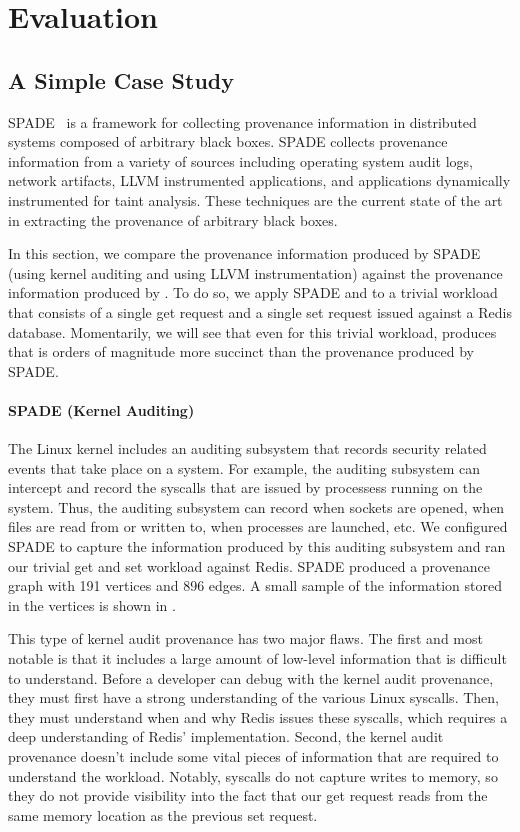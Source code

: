 \section{Evaluation}

\subsection{A Simple Case Study}
SPADE~\cite{gehani2012spade} is a framework for collecting provenance
information in distributed systems composed of arbitrary black boxes. SPADE
collects provenance information from a variety of sources including operating
system audit logs, network artifacts, LLVM instrumented applications, and
applications dynamically instrumented for taint analysis. These techniques are
the current state of the art in extracting the provenance of arbitrary black
boxes.

In this section, we compare the provenance information produced by SPADE (using
kernel auditing and using LLVM instrumentation) against the provenance
information produced by \fluent{}. To do so, we apply SPADE and \fluent{} to a
trivial workload that consists of a single get request and a single set request
issued against a Redis database. Momentarily, we will see that even for this
trivial workload, \fluent{} produces \watprovenance{} that is orders of
magnitude more succinct than the provenance produced by SPADE.

{}

\paragraph{SPADE (Kernel Auditing)}
The Linux kernel includes an auditing subsystem that records security related
events that take place on a system. For example, the auditing subsystem can
intercept and record the syscalls that are issued by processess running on the
system. Thus, the auditing subsystem can record when sockets are opened, when
files are read from or written to, when processes are launched, etc. We
configured SPADE to capture the information produced by this auditing subsystem
and ran our trivial get and set workload against Redis. SPADE produced a
provenance graph with 191 vertices and 896 edges. A small sample of the
information stored in the vertices is shown in .

This type of kernel audit provenance has two major flaws. The first and most
notable is that it includes a large amount of low-level information that is
difficult to understand. Before a developer can debug with the kernel audit
provenance, they must first have a strong understanding of the various Linux
syscalls. Then, they must understand when and why Redis issues these syscalls,
which requires a deep understanding of Redis' implementation. Second, the
kernel audit provenance doesn't include some vital pieces of information that
are required to understand the workload. Notably, syscalls do not capture
writes to memory, so they do not provide visibility into the fact that our get
request reads from the same memory location as the previous set request.

